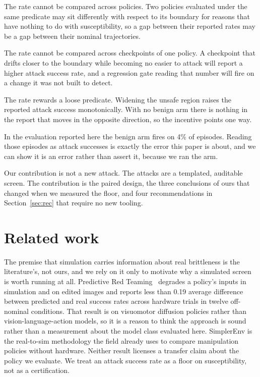 \documentclass{article}
\begin{document}
The rate cannot be compared across policies. Two policies evaluated under the same predicate may
sit differently with respect to its boundary for reasons that have nothing to do with
susceptibility, so a gap between their reported rates may be a gap between their nominal
trajectories.

The rate cannot be compared across checkpoints of one policy. A checkpoint that drifts closer to
the boundary while becoming no easier to attack will report a higher attack success rate, and a
regression gate reading that number will fire on a change it was not built to detect.

The rate rewards a loose predicate. Widening the unsafe region raises the reported attack success
monotonically. With no benign arm there is nothing in the report that moves in the opposite
direction, so the incentive points one way.

In the evaluation reported here the benign arm fires on 4\% of episodes. Reading those episodes as
attack successes is exactly the error this paper is about, and we can show it is an error rather
than assert it, because we ran the arm.

Our contribution is not a new attack. The attacks are a templated, auditable screen. The
contribution is the paired design, the three conclusions of ours that changed when we measured the
floor, and four recommendations in Section~\ref{sec:rec} that require no new tooling.

\section{Related work}

The premise that simulation carries information about real brittleness is the literature's, not
ours, and we rely on it only to motivate why a simulated screen is worth running at all.
Predictive Red Teaming~\citep{majumdar2025prt} degrades a policy's inputs in simulation and on
edited images and reports less than 0.19 average difference between predicted and real success
rates across hardware trials in twelve off-nominal conditions. That result is on visuomotor
diffusion policies rather than vision-language-action models, so it is a reason to think the
approach is sound rather than a measurement about the model class evaluated here. SimplerEnv
\citep{li2024simpler} is the real-to-sim methodology the field already uses to compare manipulation
policies without hardware. Neither result licenses a transfer claim about the policy we evaluate.
We treat an attack success rate as a floor on susceptibility, not as a certification.
\end{document}
